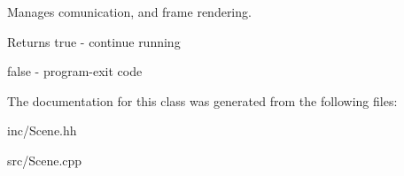 Manages comunication, and frame rendering. 

\begin{DoxyReturn}{Returns}
true -\/ continue running 

false -\/ program-\/exit code 
\end{DoxyReturn}


The documentation for this class was generated from the following files\+:\begin{DoxyCompactItemize}
\item 
inc/Scene.\+hh\item 
src/Scene.\+cpp\end{DoxyCompactItemize}
